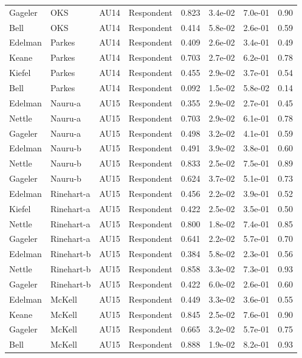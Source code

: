 \documentclass{monashthesis}
\begin{document}
\begin{center}
\begin{longtable}{llllllll}
Gageler & OKS & AU14 & Respondent & 0.823 & 3.4e-02 & 7.0e-01 & 0.90 \\
Bell & OKS & AU14 & Respondent & 0.414 & 5.8e-02 & 2.6e-01 & 0.59 \\
Edelman & Parkes & AU14 & Respondent & 0.409 & 2.6e-02 & 3.4e-01 & 0.49 \\
Keane & Parkes & AU14 & Respondent & 0.703 & 2.7e-02 & 6.2e-01 & 0.78 \\
Kiefel & Parkes & AU14 & Respondent & 0.455 & 2.9e-02 & 3.7e-01 & 0.54 \\
Bell & Parkes & AU14 & Respondent & 0.092 & 1.5e-02 & 5.8e-02 & 0.14 \\
Edelman & Nauru-a & AU15 & Respondent & 0.355 & 2.9e-02 & 2.7e-01 & 0.45 \\
Nettle & Nauru-a & AU15 & Respondent & 0.703 & 2.9e-02 & 6.1e-01 & 0.78 \\
Gageler & Nauru-a & AU15 & Respondent & 0.498 & 3.2e-02 & 4.1e-01 & 0.59 \\
Edelman & Nauru-b & AU15 & Respondent & 0.491 & 3.9e-02 & 3.8e-01 & 0.60 \\
Nettle & Nauru-b & AU15 & Respondent & 0.833 & 2.5e-02 & 7.5e-01 & 0.89 \\
Gageler & Nauru-b & AU15 & Respondent & 0.624 & 3.7e-02 & 5.1e-01 & 0.73 \\
Edelman & Rinehart-a & AU15 & Respondent & 0.456 & 2.2e-02 & 3.9e-01 & 0.52 \\
Kiefel & Rinehart-a & AU15 & Respondent & 0.422 & 2.5e-02 & 3.5e-01 & 0.50 \\
Nettle & Rinehart-a & AU15 & Respondent & 0.800 & 1.8e-02 & 7.4e-01 & 0.85 \\
Gageler & Rinehart-a & AU15 & Respondent & 0.641 & 2.2e-02 & 5.7e-01 & 0.70 \\
Edelman & Rinehart-b & AU15 & Respondent & 0.384 & 5.8e-02 & 2.3e-01 & 0.56 \\
Nettle & Rinehart-b & AU15 & Respondent & 0.858 & 3.3e-02 & 7.3e-01 & 0.93 \\
Gageler & Rinehart-b & AU15 & Respondent & 0.422 & 6.0e-02 & 2.6e-01 & 0.60 \\
Edelman & McKell & AU15 & Respondent & 0.449 & 3.3e-02 & 3.6e-01 & 0.55 \\
Keane & McKell & AU15 & Respondent & 0.845 & 2.5e-02 & 7.6e-01 & 0.90 \\
Gageler & McKell & AU15 & Respondent & 0.665 & 3.2e-02 & 5.7e-01 & 0.75 \\
Bell & McKell & AU15 & Respondent & 0.888 & 1.9e-02 & 8.2e-01 & 0.93 \\

\end{longtable}
\end{center}
\end{document}
